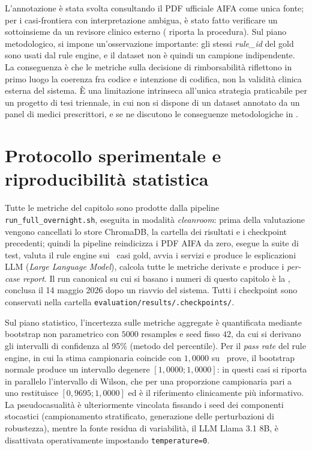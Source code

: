 L'annotazione è stata svolta consultando il PDF ufficiale AIFA come unica fonte; per i casi-frontiera con interpretazione ambigua, è stato fatto verificare un sottoinsieme da un revisore clinico esterno ( riporta la procedura). Sul piano metodologico, si impone un'osservazione importante: gli stessi \emph{rule\_id} del gold sono usati dal rule engine, e il dataset non è quindi un campione indipendente. La conseguenza è che le metriche sulla decisione di rimborsabilità riflettono in primo luogo la coerenza fra codice e intenzione di codifica, non la validità clinica esterna del sistema. È una limitazione intrinseca all'unica strategia praticabile per un progetto di tesi triennale, in cui non si dispone di un dataset annotato da un panel di medici prescrittori, e se ne discutono le conseguenze metodologiche in .

\section{Protocollo sperimentale e riproducibilità statistica}
\label{sec:protocollo}

Tutte le metriche del capitolo sono prodotte dalla pipeline \texttt{run\_full\_overnight.sh}, eseguita in modalità \emph{cleanroom}: prima della valutazione vengono cancellati lo store ChromaDB, la cartella dei risultati e i checkpoint precedenti; quindi la pipeline reindicizza i PDF AIFA da zero, esegue la suite di test, valuta il rule engine sui \goldn\ casi gold, avvia i servizi e produce le esplicazioni LLM (\emph{Large Language Model}), calcola tutte le metriche derivate e produce i \emph{per-case report}. Il run canonical su cui si basano i numeri di questo capitolo è la \cleanroomrun, conclusa il 14 maggio 2026 dopo un riavvio del sistema. Tutti i checkpoint sono conservati nella cartella \texttt{evaluation/results/.checkpoints/}.

Sul piano statistico, l'incertezza sulle metriche aggregate è quantificata mediante bootstrap non parametrico con $5000$ resamples e seed fisso $42$, da cui si derivano gli intervalli di confidenza al 95\% (metodo del percentile). Per il \emph{pass rate} del rule engine, in cui la stima campionaria coincide con $1{,}0000$ su \goldn\ prove, il bootstrap normale produce un intervallo degenere $[1{,}0000;1{,}0000]$: in questi casi si riporta in parallelo l'intervallo di Wilson, che per una proporzione campionaria pari a uno restituisce $[0{,}9695;1{,}0000]$ ed è il riferimento clinicamente più informativo. La pseudocasualità è ulteriormente vincolata fissando i seed dei componenti stocastici (campionamento stratificato, generazione delle perturbazioni di robustezza), mentre la fonte residua di variabilità, il LLM Llama 3.1 8B, è disattivata operativamente impostando \texttt{temperature=0}.

